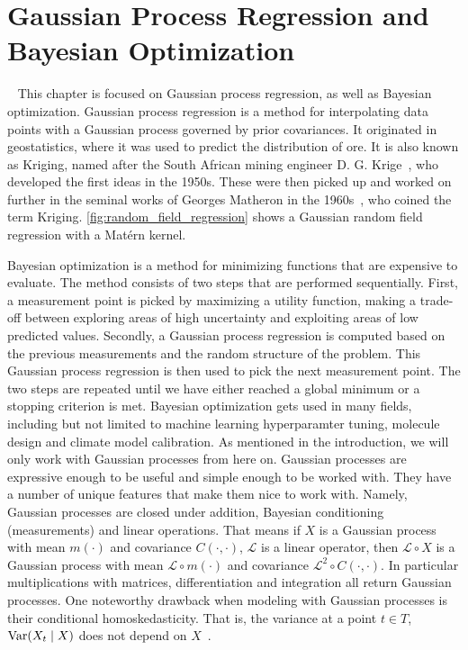 \chapter{Gaussian Process Regression and Bayesian Optimization}~\label{chap:kriging_bayes}
% 
This chapter is focused on Gaussian process regression, as well as Bayesian optimization. 
Gaussian process regression is a method for interpolating data points with a Gaussian process governed by prior covariances. 
It originated in geostatistics, where it was used to predict the distribution of ore. It is also known as Kriging, named after the South African mining engineer D. G. Krige~\cite{krige1951statistical}, who developed the first ideas in the 1950s.
These were then picked up and worked on further in the seminal works of Georges Matheron in the 1960s~\cite{matheron1963principles}, who coined the term Kriging.
\cref{fig:random_field_regression} shows a Gaussian random field regression with a Matérn kernel.

Bayesian optimization is a method for minimizing functions that are expensive to evaluate. 
The method consists of two steps that are performed sequentially. 
First, a measurement point is picked by maximizing a utility function, making a trade-off between exploring areas of high uncertainty and exploiting areas of low predicted values.
Secondly, a Gaussian process regression is computed based on the previous measurements and the random structure of the problem. 
This Gaussian process regression is then used to pick the next measurement point.
The two steps are repeated until we have either reached a global minimum or a stopping criterion is met.
Bayesian optimization gets used in many fields, including but not limited to machine learning hyperparamter tuning\cite{wu2019hyperparameter}, molecule design\cite{korovina2020chembo,griffiths2020constrained} and climate model calibration\cite{ma2022using}.
As mentioned in the introduction, we will only work with Gaussian processes from here on. Gaussian processes are expressive enough to be useful and simple enough to be worked with.
They have a number of unique features that make them nice to work with.
Namely, Gaussian processes are closed under addition, Bayesian conditioning (measurements) and linear operations. 
That means if $X$ is a Gaussian process with mean $m(\cdot)$ and covariance $C(\cdot,\cdot)$, $\mathcal{L}$ is a linear operator, then $\mathcal{L} \circ X$ is a Gaussian process with mean $\mathcal{L} \circ m(\cdot)$ and covariance $\mathcal{L}^2 \circ C(\cdot,\cdot)$. In particular multiplications with matrices, differentiation and integration all return Gaussian processes.
One noteworthy drawback when modeling with Gaussian processes is their conditional homoskedasticity. That is, the variance at a point \( t \in T \), \( \operatorname{Var}(X_{t} \mid X )  \) does not depend on $X$~\cite[p. 110]{cressie1993statistics}.
